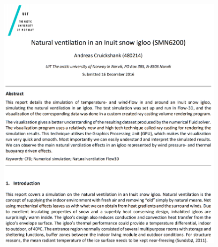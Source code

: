 \documentclass[a4paper,12pt]{extarticle}
\begin{document}
\begin{figure}[H]
  \centering
  \includegraphics[width=\textwidth]{ProjectExample.png}
\end{figure}
\end{document}
